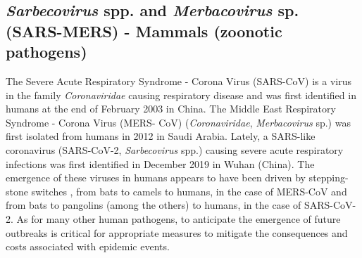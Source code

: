\subsection{\textit{Sarbecovirus}  spp. and \textit{Merbacovirus} sp. (SARS-MERS) - Mammals (zoonotic pathogens)}

The Severe Acute Respiratory Syndrome - Corona Virus (SARS-CoV) is a virus in the family \textit{Coronaviridae} causing respiratory disease and was first identified in humans at the end of February 2003 in China. The Middle East Respiratory Syndrome - Corona Virus (MERS- CoV) (\textit{Coronaviridae}, \textit{Merbacovirus} sp.) was first isolated from humans in 2012 in Saudi Arabia. Lately, a SARS-like coronavirus (SARS-CoV-2, \textit{Sarbecovirus} spp.) causing severe acute respiratory infections was first identified in December 2019 in Wuhan (China). The emergence of these viruses in humans appears to have been driven by stepping-stone switches \citep{parrish2008cross,rodriguez2020history}, from bats to camels to humans, in the case of MERS-CoV and from bats to pangolins (among the others) to humans, in the case of SARS-CoV-2. 
As for many other human pathogens, to anticipate the emergence of future outbreaks is critical for appropriate measures to mitigate the consequences and costs associated with epidemic events.

